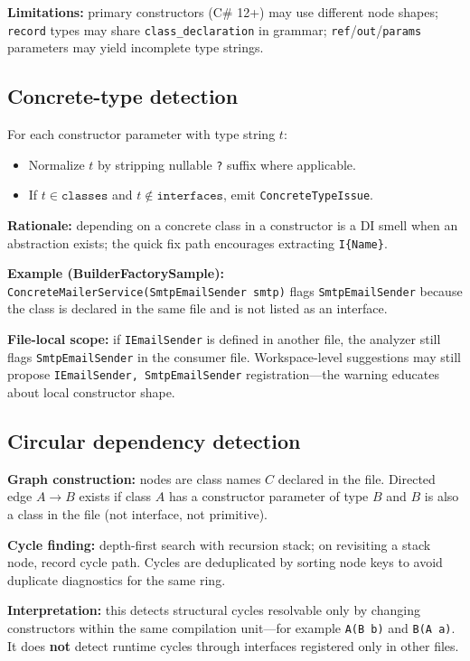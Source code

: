 \textbf{Limitations:} primary constructors (C\# 12+) may use different node shapes; \texttt{record} types may share \texttt{class\_declaration} in grammar; \texttt{ref}/\texttt{out}/\texttt{params} parameters may yield incomplete type strings.

\subsection{Concrete-type detection}

For each constructor parameter with type string \(t\):
\begin{itemize}
	\item Normalize \(t\) by stripping nullable \texttt{?} suffix where applicable.
	\item If \(t \in \texttt{classes}\) and \(t \notin \texttt{interfaces}\), emit \texttt{ConcreteTypeIssue}.
\end{itemize}

\textbf{Rationale:} depending on a concrete class in a constructor is a DI smell when an abstraction exists; the quick fix path encourages extracting \texttt{I\{Name\}}.

\textbf{Example (BuilderFactorySample):} \texttt{ConcreteMailerService(SmtpEmailSender smtp)} flags \texttt{SmtpEmailSender} because the class is declared in the same file and is not listed as an interface.

\textbf{File-local scope:} if \texttt{IEmailSender} is defined in another file, the analyzer still flags \texttt{SmtpEmailSender} in the consumer file. Workspace-level suggestions may still propose \texttt{IEmailSender, SmtpEmailSender} registration---the warning educates about local constructor shape.

\subsection{Circular dependency detection}

\textbf{Graph construction:} nodes are class names \(C\) declared in the file. Directed edge \(A \rightarrow B\) exists if class \(A\) has a constructor parameter of type \(B\) and \(B\) is also a class in the file (not interface, not primitive).

\textbf{Cycle finding:} depth-first search with recursion stack; on revisiting a stack node, record cycle path. Cycles are deduplicated by sorting node keys to avoid duplicate diagnostics for the same ring.

\textbf{Interpretation:} this detects structural cycles resolvable only by changing constructors within the same compilation unit---for example \texttt{A(B b)} and \texttt{B(A a)}. It does \textbf{not} detect runtime cycles through interfaces registered only in other files.

